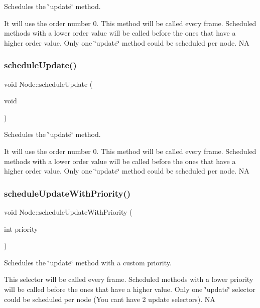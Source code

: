 Schedules the \char`\"{}update\char`\"{} method.

It will use the order number 0. This method will be called every frame. Scheduled methods with a lower order value will be called before the ones that have a higher order value. Only one \char`\"{}update\char`\"{} method could be scheduled per node.  NA \mbox{\label{classNode_a8ff9ae5e15fe4d737da30f2b05f84c1c}} 
\subsubsection{\texorpdfstring{schedule\+Update()}{scheduleUpdate()}\hspace{0.1cm}{\footnotesize\ttfamily [2/2]}}
{\footnotesize\ttfamily void Node\+::schedule\+Update (\begin{DoxyParamCaption}\item[{void}]{ }\end{DoxyParamCaption})}

Schedules the \char`\"{}update\char`\"{} method.

It will use the order number 0. This method will be called every frame. Scheduled methods with a lower order value will be called before the ones that have a higher order value. Only one \char`\"{}update\char`\"{} method could be scheduled per node.  NA \mbox{\label{classNode_aa86137d5229cb83acf5cee129a83b818}} 
\subsubsection{\texorpdfstring{schedule\+Update\+With\+Priority()}{scheduleUpdateWithPriority()}\hspace{0.1cm}{\footnotesize\ttfamily [1/2]}}
{\footnotesize\ttfamily void Node\+::schedule\+Update\+With\+Priority (\begin{DoxyParamCaption}\item[{int}]{priority }\end{DoxyParamCaption})}

Schedules the \char`\"{}update\char`\"{} method with a custom priority.

This selector will be called every frame. Scheduled methods with a lower priority will be called before the ones that have a higher value. Only one \char`\"{}update\char`\"{} selector could be scheduled per node (You can\textquotesingle{}t have 2 \textquotesingle{}update\textquotesingle{} selectors).  NA


